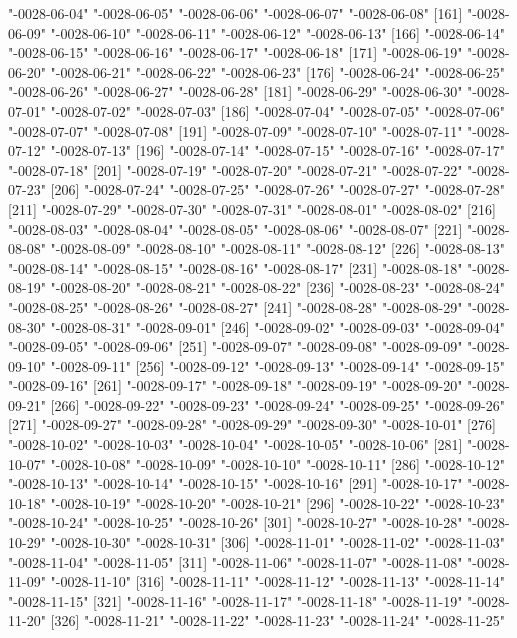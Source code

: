 \documentclass[
]{jss}
\begin{document}
\begin{CodeChunk}
\begin{CodeOutput}
[156] "-0028-06-04" "-0028-06-05" "-0028-06-06" "-0028-06-07" "-0028-06-08"
[161] "-0028-06-09" "-0028-06-10" "-0028-06-11" "-0028-06-12" "-0028-06-13"
[166] "-0028-06-14" "-0028-06-15" "-0028-06-16" "-0028-06-17" "-0028-06-18"
[171] "-0028-06-19" "-0028-06-20" "-0028-06-21" "-0028-06-22" "-0028-06-23"
[176] "-0028-06-24" "-0028-06-25" "-0028-06-26" "-0028-06-27" "-0028-06-28"
[181] "-0028-06-29" "-0028-06-30" "-0028-07-01" "-0028-07-02" "-0028-07-03"
[186] "-0028-07-04" "-0028-07-05" "-0028-07-06" "-0028-07-07" "-0028-07-08"
[191] "-0028-07-09" "-0028-07-10" "-0028-07-11" "-0028-07-12" "-0028-07-13"
[196] "-0028-07-14" "-0028-07-15" "-0028-07-16" "-0028-07-17" "-0028-07-18"
[201] "-0028-07-19" "-0028-07-20" "-0028-07-21" "-0028-07-22" "-0028-07-23"
[206] "-0028-07-24" "-0028-07-25" "-0028-07-26" "-0028-07-27" "-0028-07-28"
[211] "-0028-07-29" "-0028-07-30" "-0028-07-31" "-0028-08-01" "-0028-08-02"
[216] "-0028-08-03" "-0028-08-04" "-0028-08-05" "-0028-08-06" "-0028-08-07"
[221] "-0028-08-08" "-0028-08-09" "-0028-08-10" "-0028-08-11" "-0028-08-12"
[226] "-0028-08-13" "-0028-08-14" "-0028-08-15" "-0028-08-16" "-0028-08-17"
[231] "-0028-08-18" "-0028-08-19" "-0028-08-20" "-0028-08-21" "-0028-08-22"
[236] "-0028-08-23" "-0028-08-24" "-0028-08-25" "-0028-08-26" "-0028-08-27"
[241] "-0028-08-28" "-0028-08-29" "-0028-08-30" "-0028-08-31" "-0028-09-01"
[246] "-0028-09-02" "-0028-09-03" "-0028-09-04" "-0028-09-05" "-0028-09-06"
[251] "-0028-09-07" "-0028-09-08" "-0028-09-09" "-0028-09-10" "-0028-09-11"
[256] "-0028-09-12" "-0028-09-13" "-0028-09-14" "-0028-09-15" "-0028-09-16"
[261] "-0028-09-17" "-0028-09-18" "-0028-09-19" "-0028-09-20" "-0028-09-21"
[266] "-0028-09-22" "-0028-09-23" "-0028-09-24" "-0028-09-25" "-0028-09-26"
[271] "-0028-09-27" "-0028-09-28" "-0028-09-29" "-0028-09-30" "-0028-10-01"
[276] "-0028-10-02" "-0028-10-03" "-0028-10-04" "-0028-10-05" "-0028-10-06"
[281] "-0028-10-07" "-0028-10-08" "-0028-10-09" "-0028-10-10" "-0028-10-11"
[286] "-0028-10-12" "-0028-10-13" "-0028-10-14" "-0028-10-15" "-0028-10-16"
[291] "-0028-10-17" "-0028-10-18" "-0028-10-19" "-0028-10-20" "-0028-10-21"
[296] "-0028-10-22" "-0028-10-23" "-0028-10-24" "-0028-10-25" "-0028-10-26"
[301] "-0028-10-27" "-0028-10-28" "-0028-10-29" "-0028-10-30" "-0028-10-31"
[306] "-0028-11-01" "-0028-11-02" "-0028-11-03" "-0028-11-04" "-0028-11-05"
[311] "-0028-11-06" "-0028-11-07" "-0028-11-08" "-0028-11-09" "-0028-11-10"
[316] "-0028-11-11" "-0028-11-12" "-0028-11-13" "-0028-11-14" "-0028-11-15"
[321] "-0028-11-16" "-0028-11-17" "-0028-11-18" "-0028-11-19" "-0028-11-20"
[326] "-0028-11-21" "-0028-11-22" "-0028-11-23" "-0028-11-24" "-0028-11-25"

\end{CodeOutput}
\end{CodeChunk}
\end{document}
